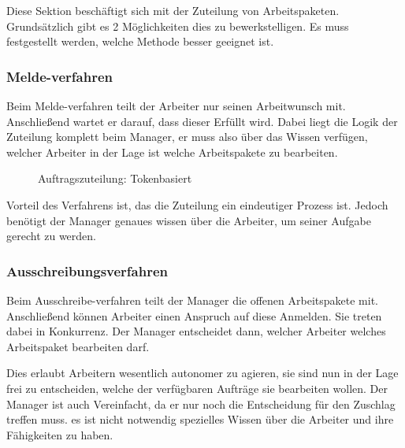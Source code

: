 Diese Sektion beschäftigt sich mit der Zuteilung von Arbeitspaketen.
Grundsätzlich gibt es 2 Möglichkeiten dies zu bewerkstelligen.
Es muss festgestellt werden, welche Methode besser geeignet ist.

\subsubsection{Melde-verfahren}
Beim Melde-verfahren teilt der Arbeiter nur seinen Arbeitwunsch mit.
Anschließend wartet er darauf, dass dieser Erfüllt wird.
Dabei liegt die Logik der Zuteilung komplett beim Manager,
er muss also über das Wissen verfügen, welcher Arbeiter in der Lage ist welche Arbeitspakete zu bearbeiten.

\begin{figure}[ht] 
  \label{fig:auftrag-zuteilung-token}
  \begin{sequencediagram}
  \end{sequencediagram}
  \caption{Auftragszuteilung: Tokenbasiert}
\end{figure}

Vorteil des Verfahrens ist, das die Zuteilung ein eindeutiger Prozess ist.
Jedoch benötigt der Manager genaues wissen über die Arbeiter,
um seiner Aufgabe gerecht zu werden.

\subsubsection{Ausschreibungsverfahren}

Beim Ausschreibe-verfahren teilt der Manager die offenen Arbeitspakete mit.
Anschließend können Arbeiter einen Anspruch auf diese Anmelden.
Sie treten dabei in Konkurrenz.
Der Manager entscheidet dann, welcher Arbeiter welches Arbeitspaket bearbeiten darf.

Dies erlaubt Arbeitern wesentlich autonomer zu agieren,
sie sind nun in der Lage frei zu entscheiden,
welche der verfügbaren Aufträge sie bearbeiten wollen.
Der Manager ist auch Vereinfacht,
da er nur noch die Entscheidung für den Zuschlag treffen muss.
es ist nicht notwendig spezielles Wissen über die Arbeiter und ihre Fähigkeiten zu haben. 


